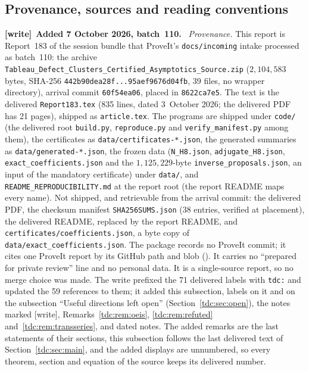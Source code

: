 \documentclass[11pt]{article}
\theoremstyle{definition}\newtheorem{definition}[theorem]{Definition}
\theoremstyle{remark}\newtheorem{remark}[theorem]{Remark}
\newcommand{\file}[1]{\nolinkurl{#1}}
\newenvironment{writenote}[1][]{\par\smallskip\begingroup\small
 \noindent\textbf{[write]}\if\relax\detokenize{#1}\relax\else~\textbf{#1.}\fi\ }%
 {\par\endgroup\smallskip}
\begin{document}
\subsection{Provenance, sources and reading conventions}\label{tdc:sec:provenance}
\begin{writenote}[Added 7 October 2026, batch~110]
\emph{Provenance.} This report is Report~183 of the session bundle that
ProveIt's \file{docs/incoming} intake processed as batch~110: the archive
\file{Tableau_Defect_Clusters_Certified_Asymptotics_Source.zip}
($2{,}104{,}583$ bytes, SHA-256 \file{442b90dea28f...95aef9676d04fb},
39 files, no wrapper directory), arrival commit \file{60f54ea06}, placed in
\file{8622ca7e5}. The text is the delivered \file{Report183.tex} (835 lines,
dated 3~October 2026; the delivered PDF has 21 pages), shipped as
\file{article.tex}. The programs are shipped under \file{code/} (the
delivered root \file{build.py}, \file{reproduce.py} and
\file{verify_manifest.py} among them), the certificates as
\file{data/certificates-*.json}, the generated summaries as
\file{data/generated-*.json}, the frozen data
(\file{N_H8.json}, \file{adjugate_H8.json}, \file{exact_coefficients.json} and
the $1{,}125{,}229$-byte \file{inverse_proposals.json}, an input of the
mandatory certificate) under \file{data/}, and \file{README_REPRODUCIBILITY.md}
at the report root (the report README maps every name). Not shipped, and
retrievable from the arrival commit: the delivered PDF, the checksum manifest
\file{SHA256SUMS.json} (38 entries, verified at placement), the delivered
README, replaced by the report README, and \file{certificates/coefficients.json},
a byte copy of \file{data/exact_coefficients.json}. The package records no
ProveIt commit; it cites one ProveIt report by its GitHub path and blob
(\cite{clustercomparison}). It carries no ``prepared for private review'' line
and no personal data. It is a single-source report, so no merge choice was
made. The write prefixed the 71 delivered labels with \file{tdc:} and
updated the 59 references to them; it added this subsection, labels on it and
on the subsection ``Useful directions left open''
(Section~\ref{tdc:sec:open}), the notes marked [write],
Remarks~\ref{tdc:rem:oeis}, \ref{tdc:rem:refuted}
and~\ref{tdc:rem:transseries}, and dated notes. The added remarks are the
last statements of their sections, this subsection follows the last delivered
text of Section~\ref{tdc:sec:main}, and the added displays are unnumbered, so
every theorem, section and equation of the source keeps its delivered number.


\end{writenote}
\end{document}
